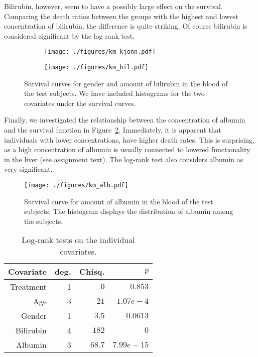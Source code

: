 \documentclass[11pt,a4paper]{article}
\begin{document}
Bilirubin, however, seem to have a possibly large effect on the survival. Comparing the death ratios between the groups with the highest and lowest concentration of bilirubin, the difference is quite striking. Of course bilirubin is considered significant by the log-rank test.
%
\begin{figure}[h!tbp]
    \centering
    \begin{subfigure}[b]{0.48\textwidth}
        \texttt{[image: ./figures/km\_kjonn.pdf]}
    \end{subfigure}%
    \quad
    \begin{subfigure}[b]{0.48\textwidth}
        \texttt{[image: ./figures/km\_bil.pdf]}
    \end{subfigure}
    \vspace{1\baselineskip}
    \caption{Survival curves for gender and amount of bilirubin in the blood of the test subjects. We have included histograms for the two covariates under the survival curves.}
    \label{fig:km_kjonn_bil}
\end{figure}

Finally, we investigated the relationship between the concentration of albumin and the survival function in Figure~\ref{fig:km_alb}. Immediately, it is apparent that individuals with lower concentrations, have higher death rates. This is surprising, as a high concentration of albumin is usually connected to lowered functionality in the liver (see assignment text).
The log-rank test also considers albumin as very significant.

\begin{figure}[h!tb]
    \begin{center}
        \texttt{[image: ./figures/km\_alb.pdf]}
    \end{center}
    \vspace{-0.8cm}
    \caption{Survival curve for amount of albumin in the blood of the test subjects. The histogram displays the distribution of albumin among the subjects.}
    \label{fig:km_alb}
\end{figure}

\begin{table}[h!tbp]
    \centering
    \caption{Log-rank tests on the individual covariates.}
    \label{tab:log_rank_indiv}
    \begin{tabular}{rrrr}
        \hline
        Covariate & deg. & Chisq. & $p$ \\ 
        \hline
        Treatment &  1 &  $0   $ & $0.853     $ \\
        Age       &  3 &  $21  $ & $1.07e-4   $ \\ 
        Gender    &  1 &  $3.5 $ & $0.0613    $ \\ 
        Bilirubin &  4 &  $182 $ & $0         $ \\ 
        Albumin   &  3 &  $68.7$ & $7.99e-15$ \\ 
        \hline
    \end{tabular}
\end{table}
\end{document}
